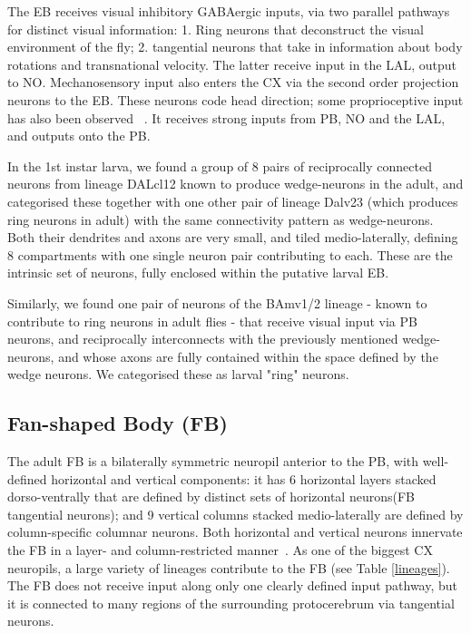 \documentclass{article}
\begin{document}
The EB receives visual inhibitory GABAergic inputs, via two parallel pathways for distinct visual information:
1. Ring neurons that deconstruct the visual environment of the fly; 2. tangential neurons that take in information about body rotations and transnational velocity. The latter receive input in the LAL, output to NO.
Mechanosensory input also enters the CX via the second order projection neurons to the EB. These neurons code head direction; some proprioceptive input has also been observed 
~\citep{hulse2021connectome}. It receives strong inputs from PB, NO and the LAL, and outputs onto the PB.  


In the 1st instar larva, we found a group of 8 pairs of reciprocally connected neurons from lineage DALcl12 known to produce wedge-neurons in the adult, and categorised these together with one other pair of lineage Dalv23 (which produces ring neurons in adult) with the same connectivity pattern as wedge-neurons. Both their dendrites and axons are very small, and tiled medio-laterally, defining 8 compartments with one single neuron pair contributing to each. These are the intrinsic set of neurons, fully enclosed within the putative larval EB. 

Similarly, we found one pair of neurons of the BAmv1/2 lineage - known to contribute to ring neurons in adult flies - that receive visual input via PB neurons, and reciprocally interconnects with the previously mentioned wedge-neurons, and whose axons are fully contained within the space defined by the wedge neurons. We categorised these as larval "ring" neurons.


\subsection{Fan-shaped Body (FB)}


The adult FB is a bilaterally symmetric neuropil anterior to the PB, with well-defined horizontal and vertical components: it has 6 horizontal layers stacked dorso-ventrally that are defined by distinct sets of horizontal neurons(FB tangential neurons); and 9 vertical columns stacked medio-laterally are defined by column-specific columnar neurons. Both horizontal and vertical neurons innervate the FB in a layer- and column-restricted manner~\citep{heinze2017unraveling}. As one of the biggest CX neuropils, a large variety of lineages contribute to the FB (see Table \ref{lineages}).
The FB does not receive input along only one clearly defined input pathway, but it is connected to many regions of the surrounding protocerebrum via tangential neurons. 
\end{document}
